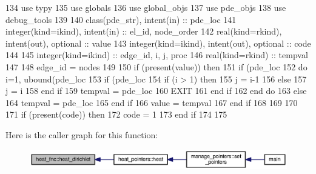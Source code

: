 \begin{DoxyCode}
134       \textcolor{keywordtype}{use }typy
135       \textcolor{keywordtype}{use }globals
136       \textcolor{keywordtype}{use }global_objs
137       \textcolor{keywordtype}{use }pde_objs
138       \textcolor{keywordtype}{use }debug_tools
139       
140       \textcolor{keywordtype}{class}(pde_str), \textcolor{keywordtype}{intent(in)} :: pde\_loc
141       \textcolor{keywordtype}{integer(kind=ikind)}, \textcolor{keywordtype}{intent(in)}  :: el\_id, node\_order
142       \textcolor{keywordtype}{real(kind=rkind)}, \textcolor{keywordtype}{intent(out)}, \textcolor{keywordtype}{optional}    :: value
143       \textcolor{keywordtype}{integer(kind=ikind)}, \textcolor{keywordtype}{intent(out)}, \textcolor{keywordtype}{optional} :: code
144       
145       \textcolor{keywordtype}{integer(kind=ikind)} :: edge\_id, i, j, proc
146       \textcolor{keywordtype}{real(kind=rkind)} :: tempval
147       
148       edge\_id = nodes%
149       
150       \textcolor{keywordflow}{if} (\textcolor{keyword}{present}(\textcolor{keywordtype}{value})) \textcolor{keywordflow}{then}
151         \textcolor{keywordflow}{if} (pde\_loc%
152           \textcolor{keywordflow}{do} i=1, ubound(pde\_loc%
153             \textcolor{keywordflow}{if} (pde\_loc%
154               \textcolor{keywordflow}{if} (i > 1) \textcolor{keywordflow}{then}
155                 j = i-1
156               \textcolor{keywordflow}{else}
157                 j = i
158 \textcolor{keywordflow}{              end if}
159               tempval = pde\_loc%
160               \textcolor{keywordflow}{EXIT}
161 \textcolor{keywordflow}{            end if}
162 \textcolor{keywordflow}{          end do}
163         \textcolor{keywordflow}{else}
164           tempval =  pde\_loc%
165 \textcolor{keywordflow}{        end if}
166         \textcolor{keywordtype}{value} = tempval 
167 \textcolor{keywordflow}{      end if}
168 
169 
170       
171       \textcolor{keywordflow}{if} (\textcolor{keyword}{present}(code)) \textcolor{keywordflow}{then}
172         code = 1
173 \textcolor{keywordflow}{      end if}
174       
175 
\end{DoxyCode}


Here is the caller graph for this function\+:\nopagebreak
\begin{figure}[H]
\begin{center}
\leavevmode
\includegraphics[width=350pt]{namespaceheat__fnc_a43be05f9337467723d91383df8383544_icgraph}
\end{center}
\end{figure}


